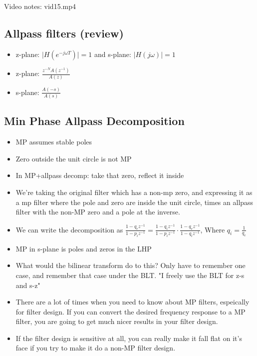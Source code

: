 Video notes: vid15.mp4
\subsection*{Allpass filters (review)}

\begin{itemize}
\item{
z-plane: $\vert H(e^{-j\omega T}) \vert = 1$ and
s-plane: $\vert H(j\omega) \vert = 1$ 
}
\item{
z-plane: $\frac{z^{-N}A(z^{-1})}{A(z)}$
}
\item{
s-plane: $\frac{A(-s)}{A(s)}$
}
\end{itemize}

\subsection*{Min Phase Allpass Decomposition }
\begin{itemize}
\item{MP assumes stable poles}
\item{Zero outside the unit circle is not MP}
\item{In MP+allpass decomp: take that zero, reflect it inside}
\item{
We're taking the original filter which has a non-mp zero, and 
expressing it as a mp filter where the pole and zero are inside 
the unit circle, times an allpass filter with the non-MP zero and
a pole at the inverse. 
}
\item{
We can write the decomposition as
$
\frac{1 - q_e z^{-1}}{1 - p_i z^{-1}} =
\frac{1 - q_i z^{-1}}{1 - p_i z^{-1}} \cdot
\frac{1 - q_ez^{-1}}{1 - q_i z^{-1}}
$, Where $q_i = \frac{1}{q_e}$
}
\item{
MP in s-plane is poles and zeros in the LHP
}
\item{
What would the bilinear transform do to this? Only have to remember
one case, and remember that case under the BLT. "I freely use the BLT
for z-s and s-z"
}
\item{
There are a lot of times when you need to know about MP filters, espeically
for filter design. If you can convert the desired frequency response
to a MP filter, you are going to get much nicer results in your 
filter design.
}
\item{
If the filter design is sensitive at all, you can really make it fall
flat on it's face if you try to make it do a non-MP filter design.
}
\end{itemize}
